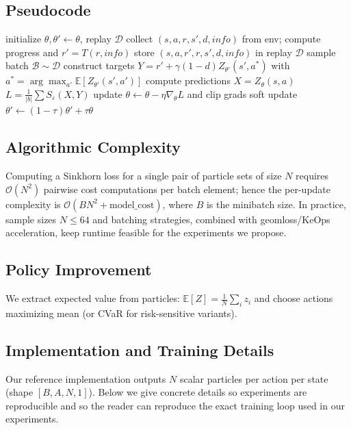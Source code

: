 \documentclass{article}
\begin{document}
\subsection{Pseudocode}
\begin{algorithm}[h!]
\caption{MaxSink training loop (single process)}
\begin{algorithmic}[1]
\State initialize $\theta,\theta'\gets \theta$, replay $\mathcal{D}$
  \State collect $(s,a,r,s',d,info)$ from env; compute progress and $r'=T(r,info)$
  \State store $(s,a,r',r,s',d,info)$ in replay $\mathcal{D}$
    \State sample batch $\mathcal{B}\sim\mathcal{D}$
      \State construct targets $Y = r' + \gamma (1-d) Z_{\theta'}(s', a^*)$ with $a^*=\arg\max_{a'}\mathbb{E}[Z_{\theta'}(s',a')]$
      \State compute predictions $X = Z_\theta(s,a)$
      \State $L = \frac{1}{|b|}\sum S_\varepsilon(X,Y)$
      \State update $\theta \leftarrow \theta - \eta \nabla_\theta L$ and clip grads
    \EndFor
    \State soft update $\theta'\leftarrow (1-\tau)\theta' + \tau\theta$
  \EndIf
\EndFor
\end{algorithmic}
\label{alg:maxsink}
\end{algorithm}

\subsection{Algorithmic Complexity}
Computing a Sinkhorn loss for a single pair of particle sets of size $N$ requires $\mathcal{O}(N^2)$ pairwise cost computations per batch element; hence the per-update complexity is $\mathcal{O}(B N^2 + \text{model\_cost})$, where $B$ is the minibatch size. In practice, sample sizes $N\le64$ and batching strategies, combined with geomloss/KeOps acceleration, keep runtime feasible for the experiments we propose.

\subsection{Policy Improvement}
We extract expected value from particles: $\mathbb{E}[Z]=\frac{1}{N}\sum_i z_i$ and choose actions maximizing mean (or CVaR for risk-sensitive variants).

\subsection{Implementation and Training Details}
Our reference implementation outputs $N$ scalar particles per action per state (shape $[B,A,N,1]$). Below we give concrete details so experiments are reproducible and so the reader can reproduce the exact training loop used in our experiments.
\end{document}
